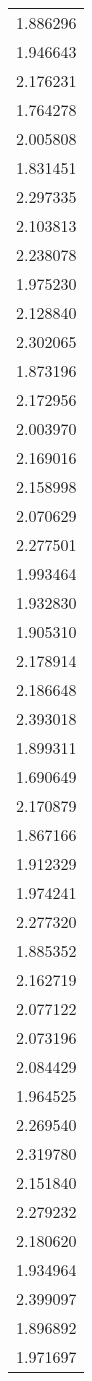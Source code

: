 \begin{longtable}[c]{l}
    1.886296 \\
    1.946643 \\
    2.176231 \\
    1.764278 \\
    2.005808 \\
    1.831451 \\
    2.297335 \\
    2.103813 \\
    2.238078 \\
    1.975230 \\
    2.128840 \\
    2.302065 \\
    1.873196 \\
    2.172956 \\
    2.003970 \\
    2.169016 \\
    2.158998 \\
    2.070629 \\
    2.277501 \\
    1.993464 \\
    1.932830 \\
    1.905310 \\
    2.178914 \\
    2.186648 \\
    2.393018 \\
    1.899311 \\
    1.690649 \\
    2.170879 \\
    1.867166 \\
    1.912329 \\
    1.974241 \\
    2.277320 \\
    1.885352 \\
    2.162719 \\
    2.077122 \\
    2.073196 \\
    2.084429 \\
    1.964525 \\
    2.269540 \\
    2.319780 \\
    2.151840 \\
    2.279232 \\
    2.180620 \\
    1.934964 \\
    2.399097 \\
    1.896892 \\
    1.971697 \\

\end{longtable}
